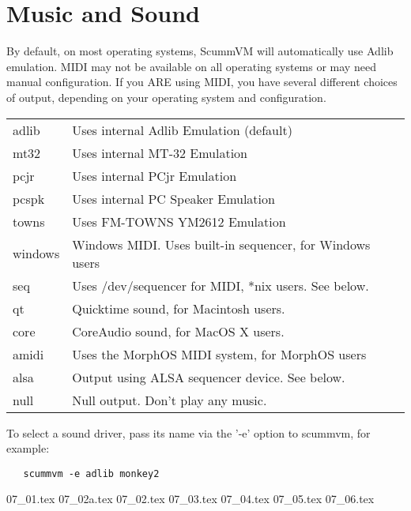 

\section{Music and Sound}
By default, on most operating systems, ScummVM will automatically use Adlib
emulation. MIDI may not be available on all operating systems or may need
manual configuration. If you ARE using MIDI, you have several different
choices of output, depending on your operating system and configuration.

\begin{tabular}[h]{ll}
  adlib     & Uses internal Adlib Emulation (default)\\
  mt32      & Uses internal MT-32 Emulation\\
  pcjr      & Uses internal PCjr Emulation \\
  pcspk     & Uses internal PC Speaker Emulation\\
  towns     & Uses FM-TOWNS YM2612 Emulation\\
  windows   & Windows MIDI. Uses built-in sequencer, for Windows users\\
  seq       & Uses /dev/sequencer for MIDI, *nix users. See below.\\
  qt        & Quicktime sound, for Macintosh users.\\
  core      & CoreAudio sound, for MacOS X users.\\
  amidi     & Uses the MorphOS MIDI system, for MorphOS users\\
  alsa      & Output using ALSA sequencer device. See below.\\
  null      & Null output. Don't play any music.\\
\end{tabular}

To select a sound driver, pass its name via the '-e' option to scummvm,
for example:
\begin{verbatim}
   scummvm -e adlib monkey2
\end{verbatim}

 {07_01.tex}
 {07_02a.tex}
 {07_02.tex}
 {07_03.tex}
 {07_04.tex}
 {07_05.tex}
 {07_06.tex}
